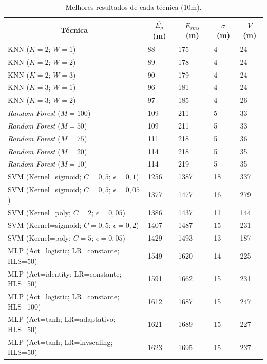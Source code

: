 \documentclass[12pt]{article}
\begin{document}
        \begin{center}
        \begin{longtable}{|l|l|l|l|l|}
        \caption{Melhores resultados de cada técnica (10m).} 
        \label{table:resultsTop510m} \\
        \hline \multicolumn{1}{|c|}{\textbf{Técnica}} & \multicolumn{1}{c|}{\textbf{$\overline{E_{\mu}}$ (m)}} & \multicolumn{1}{c|}{\textbf{$\overline{E_{rms}}$ (m)}} & \multicolumn{1}{c|}{\textbf{$\overline{\sigma}$ (m)}} & \multicolumn{1}{c|}{\textbf{$\overline{V}$ (m)}} \\ \hline
        \endfirsthead
        \hline
        \endlastfoot
        KNN ($K=2$; $W=1$) & 88 & 175 & 4 & 24 \\
        KNN ($K=2$; $W=2$) & 89 & 178 & 4 & 24 \\
        KNN ($K=2$; $W=3$) & 90 & 179 & 4 & 24 \\
        KNN ($K=3$; $W=1$) & 96 & 181 & 4 & 24 \\
        KNN ($K=3$; $W=2$) & 97 & 185 & 4 & 26 \\
        \hline
        \textit{Random Forest} ($M=100$) & 109 & 211 & 5 & 33 \\
        \textit{Random Forest} ($M=50$) & 109 & 211 & 5 & 33 \\
        \textit{Random Forest} ($M=75$) & 111 & 218 & 5 & 36 \\
        \textit{Random Forest} ($M=20$) & 114 & 218 & 5 & 35 \\
        \textit{Random Forest} ($M=10$) & 114 & 219 & 5 & 35 \\
        \hline
        SVM (Kernel=sigmoid; $C=0,5$; $\epsilon=0,1$) & 1256 & 1387 & 18 & 337 \\
        SVM (Kernel=sigmoid; $C=0,5$; $\epsilon=0,05$) & 1377 & 1477 & 16 & 279 \\
        SVM (Kernel=poly; $C=2$; $\epsilon=0,05$) & 1386 & 1437 & 11 & 144 \\
        SVM (Kernel=sigmoid; $C=0,5$; $\epsilon=0,2$) & 1407 & 1487 & 15 & 231 \\
        SVM (Kernel=poly; $C=5$; $\epsilon=0,05$) & 1429 & 1493 & 13 & 187 \\
        \hline
        MLP (Act=logistic; LR=constante; HLS=50) & 1549 & 1620 & 14 & 225 \\
        MLP (Act=identity; LR=constante; HLS=50) & 1591 & 1662 & 15 & 231 \\
        MLP (Act=logistic; LR=constante; HLS=100) & 1612 & 1687 & 15 & 247 \\
        MLP (Act=tanh; LR=adaptativo; HLS=50) & 1621 & 1689 & 15 & 227 \\
        MLP (Act=tanh; LR=invscaling; HLS=50) & 1623 & 1695 & 15 & 237 \\
        \end{longtable}
        \end{center}
        
\end{document}
